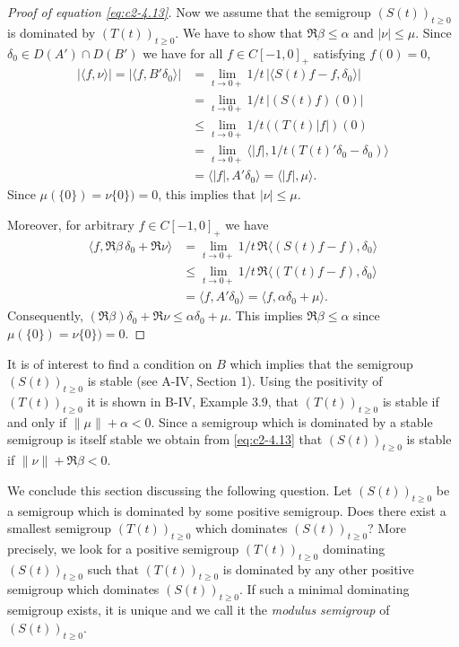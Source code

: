 \begin{proof}[Proof of equation \eqref{eq:c2-4.13}]
Now we assume that the semigroup $(S(t))_{t \geq 0}$ is dominated by $(T(t))_{t \geq 0}$.
We have to show that $\Re\beta \leq \alpha$ and $|\nu| \leq \mu$.
Since $\delta_{0} \in D(A') \cap D(B')$ we have for all $f \in C[-1,0]_{+}$ satisfying $f(0) = 0$,
\begin{align*}
|\langle f,\nu\rangle| = |\langle f,B'\delta_{0}\rangle| &= \lim_{t \to 0+} 1/t \, |\langle S(t)f - f , \delta_{0}\rangle|\\
&= \lim_{t \to 0+} 1/t \, |(S(t)f)(0)|  \\
&\leq \lim_{t \to 0+} 1/t \, ((T(t)|f|)(0) \\
&= \lim_{t \to 0+} \langle|f|,1/t(T(t)'\delta_{0} - \delta_{0})\rangle \\
&= \langle|f|,A'\delta_{0}\rangle = \langle|f|,\mu\rangle.
\end{align*}
Since $\mu(\{0\}) = \nu\{0\}) = 0$, this implies that $|\nu| \leq \mu$.

Moreover, for arbitrary $f \in C[-1,0]_{+}$ we have
\begin{align*}
\langle f,\Re\beta \, \delta_{0} + \Re\nu\rangle &= \lim_{t \to 0+} 1/t \, \Re\langle(S(t)f - f),\delta_{0}\rangle\\
&\leq \lim_{t \to 0+} 1/t \, \Re\langle(T(t)f - f),\delta_{0}\rangle \\
&= \langle f,A'\delta_{0}\rangle = \langle f,\alpha\delta_{0} + \mu\rangle.
\end{align*}
Consequently, $(\Re\beta)\delta_{0} + \Re\nu \leq \alpha\delta_{0} + \mu$.
This implies $\Re\beta \leq \alpha$ since $\mu(\{0\}) = \nu\{0\}) = 0$.
\end{proof}
\begin{remark*}
	It is of interest to find a condition on $B$ which implies that the semigroup $(S(t))_{t \geq 0}$ is stable (see A-IV, Section 1).
	Using the positivity of $(T(t))_{t \geq 0}$ it is shown in B-IV, Example 3.9, that
	$(T(t))_{t \geq 0}$ is stable if and only if $\|\mu\| + \alpha < 0$.
	Since a semigroup which is dominated by a stable semigroup is itself stable we obtain from \eqref{eq:c2-4.13} that $(S(t))_{t \geq 0}$ is stable if $\|\nu\| + \Re\beta < 0$.
\end{remark*}
We conclude this section discussing the following question.
Let $(S(t))_{t \geq 0}$ be a semigroup which is dominated by some positive semigroup.
Does there exist a smallest semigroup $(T(t))_{t \geq 0}$ which dominates $(S(t))_{t \geq 0}$?
More precisely, we look for a positive semigroup $(T(t))_{t \geq 0}$ dominating $(S(t))_{t \geq 0}$ such that $(T(t))_{t \geq 0}$ is dominated
by any other positive semigroup which dominates $(S(t))_{t \geq 0}$.
If such a minimal dominating semigroup exists, it is unique and we call it the
\emph{modulus semigroup} of $(S(t))_{t \geq 0}$.

